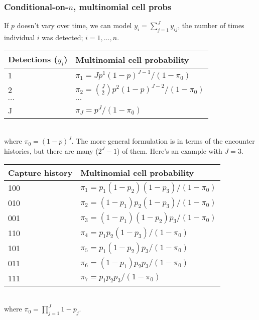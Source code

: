 \documentclass[color=usenames,dvipsnames]{beamer}\usepackage[]{graphicx}\usepackage[]{color}
\begin{document}
\begin{frame}
  \frametitle{Conditional-on-$n$, multinomial cell probs}
  \footnotesize
  If $p$ doesn't vary over time, we can model $y_i=\sum_{j=1}^J y_{ij}$,
  the number of times individual $i$ was detected; $i=1,\dots,n$.  \\
  \pause %
  \scriptsize
  \centering
  \vspace{6pt}
  \begin{tabular}{ll}
    \hline
    Detections ($y_i$) & Multinomial cell probability                       \\
    \hline
      1                & $\pi_1 = Jp^{1}(1-p)^{J-1}/(1-\pi_0)$ \\
      2                & $\pi_2 = {J\choose 2}p^{2}(1-p)^{J-2}/(1-\pi_0)$ \\
      $\cdots$         & $\cdots$                                           \\
      J                & $\pi_J = p^{J}/(1-\pi_0)$            \\
      \hline
  \end{tabular}
  \\ where $\pi_0=(1-p)^J$. 
  \pause \vfill
  \footnotesize
  \flushleft
  The more general formulation is in terms of the encounter histories,
  but there are many ($2^J-1$) of them. Here's an example with $J=3$.         \\
  \scriptsize
  \vspace{6pt}
  \centering
    \begin{tabular}{ll}
      \hline
      Capture history  & Multinomial cell probability                       \\
      \hline
      100              & $\pi_1=p_1(1-p_2)(1-p_3)/(1-\pi_0)$                \\
      010              & $\pi_2=(1-p_1)p_2(1-p_3)/(1-\pi_0)$                \\
      001              & $\pi_3=(1-p_1)(1-p_2)p_3/(1-\pi_0)$                \\
      110              & $\pi_4=p_1p_2(1-p_3)/(1-\pi_0)$                    \\
      101              & $\pi_5=p_1(1-p_2)p_3/(1-\pi_0)$                    \\
      011              & $\pi_6=(1-p_1)p_2p_3/(1-\pi_0)$                    \\
      111              & $\pi_7 = p_1p_2p_3/(1-\pi_0)$                      \\
      \hline
    \end{tabular}
  \\ where $\pi_0=\prod_{j=1}^J 1-p_j$. 
\end{frame}
\end{document}
